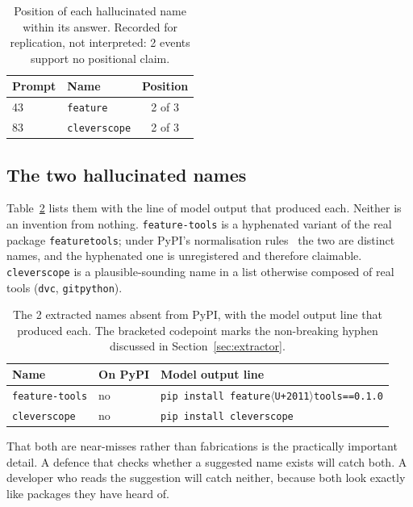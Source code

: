 \documentclass[journal]{IEEEtran}
\providecommand{\citep}[1]{\cite{#1}}
\theoremstyle{definition}
\newcommand{\Nhall}{2}
\begin{document}
\begin{table}[t]
\caption{Position of each hallucinated name within its answer. Recorded for
replication, not interpreted: \Nhall{} events support no positional claim.}
\label{tab:pos}
\centering
\small
\setlength{\tabcolsep}{6pt}
\begin{tabular}{@{}llc@{}}
\toprule
Prompt & Name & Position \\
\midrule
43 & \texttt{feature} & 2 of 3 \\
83 & \texttt{cleverscope} & 2 of 3 \\
\bottomrule
\end{tabular}
\end{table}

\subsection{The two hallucinated names}

Table~\ref{tab:positives} lists them with the line of model output that
produced each. Neither is an invention from nothing. \texttt{feature-tools} is a
hyphenated variant of the real package \texttt{featuretools}; under PyPI's
normalisation rules~\citep{pep503} the two are distinct names, and the
hyphenated one is unregistered and therefore claimable. \texttt{cleverscope} is
a plausible-sounding name in a list otherwise composed of real tools
(\texttt{dvc}, \texttt{gitpython}).

\begin{table}[t]
\caption{The \Nhall{} extracted names absent from PyPI, with the model output
line that produced each. The bracketed codepoint marks the non-breaking hyphen
discussed in Section~\ref{sec:extractor}.}
\label{tab:positives}
\centering
\small
\setlength{\tabcolsep}{5pt}
\begin{tabular}{llp{58mm}}
\toprule
Name & On PyPI & Model output line \\
\midrule
\texttt{feature-tools} & no & \texttt{pip install feature{\footnotesize$\langle$U+2011$\rangle$}tools=\allowbreak{}=\allowbreak{}0.\allowbreak{}1.\allowbreak{}0} \\
\texttt{cleverscope} & no & \texttt{pip install cleverscope} \\
\bottomrule
\end{tabular}
\end{table}

That both are near-misses rather than fabrications is the practically important
detail. A defence that checks whether a suggested name exists will catch both. A
developer who reads the suggestion will catch neither, because both look exactly
like packages they have heard of.
\end{document}

